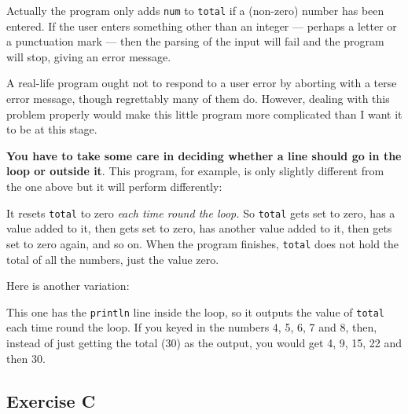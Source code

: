 Actually the program only adds  \texttt{num} to \texttt{total} if a (non-zero) 
number has been entered. 
If the user enters something other than an integer 
--- perhaps a letter or a punctuation mark --- 
then the parsing of the input will fail 
and the program will stop, giving an error message.

A real-life program ought not to respond to a user error by aborting
with a terse error message, though regrettably many of them do.
However, dealing with this problem properly would make this little program
more complicated than I want it to be at this stage.

\textbf{You have to take some care in deciding whether a line should go in the
loop or outside it}.  This program, for example, is only slightly different
from the one above but it will perform differently:


It resets \texttt{total} to zero \emph{each time round the loop.}  So
\texttt{total} gets set to zero,
has a value added to it, then gets set to zero, has another value added to
it, then gets set to zero again, and so on.  When the program finishes,
\texttt{total} does not hold the total of all the numbers, just the value
zero.

Here is another variation:


This one has the \texttt{println} line inside the loop, so it outputs the value
of \texttt{total} each time round the loop.  If you keyed in the numbers
4, 5, 6, 7 and 8, then, instead of just getting the total (30) as the output,
you would get 4, 9, 15, 22 and then 30.

\subsection*{Exercise C}

